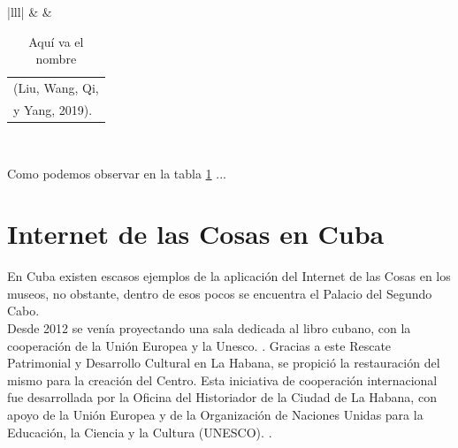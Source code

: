 \begin{table}[h]
\begin{tabular}{|lll|}
                                                                                     &  & \begin{tabular}[c]{@{}l@{}}(Liu, Wang, Qi,\\ y Yang, 2019).\end{tabular} \\ \hline
                \end{tabular}
            \caption{Aquí va el nombre}
            \label{tab: relacion_autores}
        \end{table}
        \vspace{5cm}
        
        Como podemos observar en la tabla \ref{tab: relacion_autores} ...
        

    \section{Internet de las Cosas en Cuba}\label{sec:iotCuba} 
        En Cuba existen escasos ejemplos de la aplicación del Internet de las Cosas en los museos, no obstante, dentro de esos pocos se encuentra el Palacio del Segundo Cabo.\\
        
        Desde 2012 se venía proyectando una sala dedicada al libro cubano, con la cooperación de la Unión Europea y la Unesco. \cite{oficinaHistoriadorRescatepatrimonio}. Gracias a este Rescate Patrimonial y Desarrollo Cultural en La Habana, se propició la restauración del mismo para la creación del Centro. Esta iniciativa de cooperación internacional fue desarrollada por la Oficina del Historiador de la Ciudad de La Habana, con apoyo de la Unión Europea y de la Organización de Naciones Unidas para la Educación, la Ciencia y la Cultura (UNESCO). \cite{potencialidadProyectoMuseologico}.\\
        
